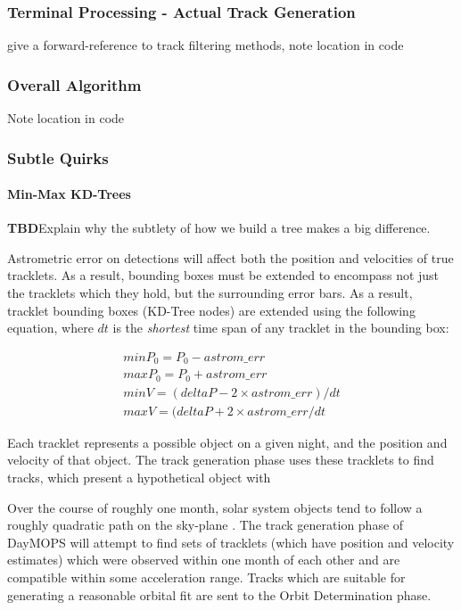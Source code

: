 \subsubsection{Terminal Processing - Actual Track Generation}

give a forward-reference to track filtering methods, note location in code

\subsubsection{Overall Algorithm}

Note location in code

\subsubsection{Subtle Quirks}

\paragraph{Min-Max KD-Trees} \textbf{TBD}Explain why the subtlety of how we build a tree makes a big difference.

Astrometric error on detections will affect both the position and
velocities of true tracklets.  As a result, bounding boxes must be
extended to encompass not just the tracklets which they hold, but the
surrounding error bars.  As a result, tracklet bounding boxes (KD-Tree
nodes) are extended using the following equation, where $dt$ is the
\textit{shortest} time span of any tracklet in the bounding box:

\begin{eqnarray}
minP_0 = P_0 - astrom\_err \\
maxP_0 = P_0 + astrom\_err \\
minV = (deltaP - 2\times astrom\_err)/dt  \\
maxV = (deltaP + 2\times astrom\_err /dt
\end{eqnarray}






Each tracklet represents a possible object on a given night, and the
position and velocity of that object.  The track generation phase uses
these tracklets to find tracks, which present a hypothetical object
with

Over the course of roughly one month, solar system objects tend to
follow a roughly quadratic path on the sky-plane
\citep{kubica_thesis}.  The track generation phase of DayMOPS will
attempt to find sets of tracklets (which have position and velocity
estimates) which were observed within one month of each other and are
compatible within some acceleration range.  Tracks which are
suitable for generating a reasonable orbital fit are sent to the Orbit
Determination phase.

